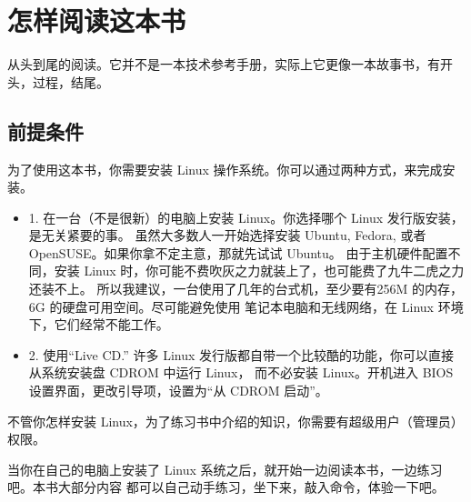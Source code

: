 \section{怎样阅读这本书} %
\label{sec:怎样阅读这本书}

从头到尾的阅读。它并不是一本技术参考手册，实际上它更像一本故事书，有开头，过程，结尾。

\subsection{前提条件} %
\label{ssub:_前提条件}
为了使用这本书，你需要安装 Linux 操作系统。你可以通过两种方式，来完成安装。
\begin{itemize}
\item 1. 在一台（不是很新）的电脑上安装 Linux。你选择哪个 Linux 发行版安装，是无关紧要的事。 虽然大多数人一开始选择安装 Ubuntu, Fedora, 或者 OpenSUSE。如果你拿不定主意，那就先试试 Ubuntu。 由于主机硬件配置不同，安装 Linux 时，你可能不费吹灰之力就装上了，也可能费了九牛二虎之力还装不上。 所以我建议，一台使用了几年的台式机，至少要有256M 的内存，6G 的硬盘可用空间。尽可能避免使用 笔记本电脑和无线网络，在 Linux 环境下，它们经常不能工作。

\item 2. 使用“Live CD.” 许多 Linux 发行版都自带一个比较酷的功能，你可以直接从系统安装盘 CDROM 中运行 Linux， 而不必安装 Linux。开机进入 BIOS 设置界面，更改引导项，设置为“从 CDROM 启动”。
\end{itemize}

\par 不管你怎样安装 Linux，为了练习书中介绍的知识，你需要有超级用户（管理员）权限。

\par 当你在自己的电脑上安装了 Linux 系统之后，就开始一边阅读本书，一边练习吧。本书大部分内容 都可以自己动手练习，坐下来，敲入命令，体验一下吧。




